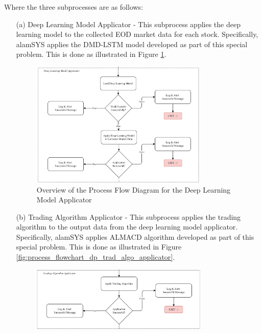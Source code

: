 Where the three subprocesses are as follows:
\begin{itemize}
    \item[(a)] Deep Learning Model Applicator - This subprocess applies the deep learning model
    to the collected EOD market data for each stock. Specifically, alamSYS applies the DMD-LSTM
    model developed as part of this special problem. This is done as illustrated in Figure
    \ref{fig:process_flowchart_dp_model_applicator}.
    \begin{figure}[ht]
        \centering
        \includegraphics[width=0.80\textwidth]{./assets/Chapter_3/PFC/ProcessFlowchart_DataProcessor1.png}
        \caption{Overview of the Process Flow Diagram for the Deep Learning Model Applicator}
        \label{fig:process_flowchart_dp_model_applicator}
    \end{figure}
    \FloatBarrier
    \item[(b)] Trading Algorithm Applicator - This subprocess applies the trading algorithm
    to the output data from the deep learning model applicator. Specifically, alamSYS applies
    ALMACD algorithm developed as part of this special problem. This is done as illustrated in Figure
    \ref{fig:process_flowchart_dp_trad_algo_applicator}.
    \begin{figure}[ht]
        \centering
        \includegraphics[width=0.80\textwidth]{./assets/Chapter_3/PFC/ProcessFlowchart_DataProcessor2.png}

\end{figure}
\end{itemize}
